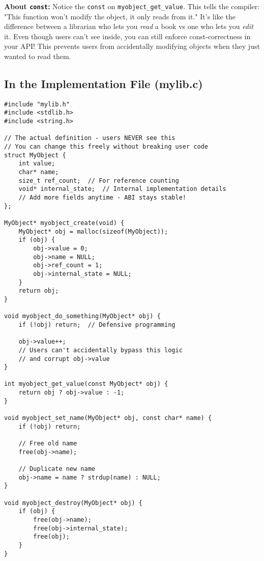 \begin{notebox}
\textbf{About \texttt{const}:} Notice the \texttt{const} on \texttt{myobject\_get\_value}. This tells the compiler: "This function won't modify the object, it only reads from it." It's like the difference between a librarian who lets you \textit{read} a book vs one who lets you \textit{edit} it. Even though users can't see inside, you can still enforce const-correctness in your API! This prevents users from accidentally modifying objects when they just wanted to read them.
\end{notebox}

\subsection{In the Implementation File (mylib.c)}

\begin{lstlisting}
#include "mylib.h"
#include <stdlib.h>
#include <string.h>

// The actual definition - users NEVER see this
// You can change this freely without breaking user code
struct MyObject {
    int value;
    char* name;
    size_t ref_count;  // For reference counting
    void* internal_state;  // Internal implementation details
    // Add more fields anytime - ABI stays stable!
};

MyObject* myobject_create(void) {
    MyObject* obj = malloc(sizeof(MyObject));
    if (obj) {
        obj->value = 0;
        obj->name = NULL;
        obj->ref_count = 1;
        obj->internal_state = NULL;
    }
    return obj;
}

void myobject_do_something(MyObject* obj) {
    if (!obj) return;  // Defensive programming

    obj->value++;
    // Users can't accidentally bypass this logic
    // and corrupt obj->value
}

int myobject_get_value(const MyObject* obj) {
    return obj ? obj->value : -1;
}

void myobject_set_name(MyObject* obj, const char* name) {
    if (!obj) return;

    // Free old name
    free(obj->name);

    // Duplicate new name
    obj->name = name ? strdup(name) : NULL;
}

void myobject_destroy(MyObject* obj) {
    if (obj) {
        free(obj->name);
        free(obj->internal_state);
        free(obj);
    }
}
\end{lstlisting}

